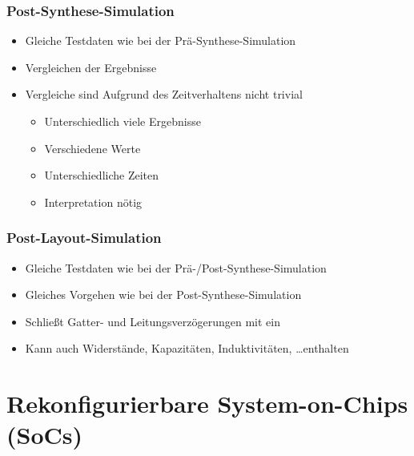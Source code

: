 \documentclass[a4paper, 11pt, accentcolor = tud3b]{tudreport}
\begin{document}
			\subsection{Post-Synthese-Simulation}
				\begin{itemize}
					\item Gleiche Testdaten wie bei der Prä-Synthese-Simulation
					\item Vergleichen der Ergebnisse
					\item Vergleiche sind Aufgrund des Zeitverhaltens nicht trivial
						\begin{itemize}
							\item Unterschiedlich viele Ergebnisse
							\item Verschiedene Werte
							\item Unterschiedliche Zeiten
							\item Interpretation nötig
						\end{itemize}
				\end{itemize}
			
			\subsection{Post-Layout-Simulation}
				\begin{itemize}
					\item Gleiche Testdaten wie bei der Prä-/Post-Synthese-Simulation
					\item Gleiches Vorgehen wie bei der Post-Synthese-Simulation
					\item Schließt Gatter- und Leitungsverzögerungen mit ein
					\item Kann auch Widerstände, Kapazitäten, Induktivitäten, \dots enthalten
				\end{itemize}
    
    \chapter{Rekonfigurierbare System-on-Chips (SoCs)}
\end{document}
